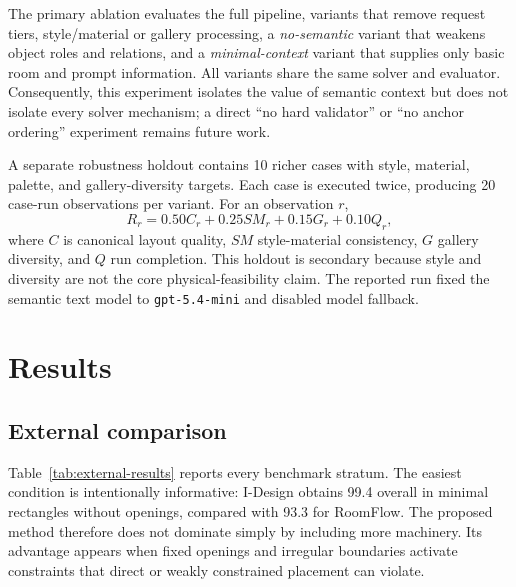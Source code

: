 \documentclass[pdflatex,sn-mathphys-num]{sn-jnl}
\newcommand{\method}{RoomFlow}
\begin{document}
The primary ablation evaluates the full pipeline, variants that remove request tiers, style/material or gallery processing, a \emph{no-semantic} variant that weakens object roles and relations, and a \emph{minimal-context} variant that supplies only basic room and prompt information. All variants share the same solver and evaluator. Consequently, this experiment isolates the value of semantic context but does not isolate every solver mechanism; a direct ``no hard validator'' or ``no anchor ordering'' experiment remains future work.

A separate robustness holdout contains 10 richer cases with style, material, palette, and gallery-diversity targets. Each case is executed twice, producing 20 case-run observations per variant. For an observation \(r\),
\begin{equation}
  R_r=0.50C_r+0.25SM_r+0.15G_r+0.10Q_r,
  \label{eq:robustness}
\end{equation}
where \(C\) is canonical layout quality, \(SM\) style-material consistency, \(G\) gallery diversity, and \(Q\) run completion. This holdout is secondary because style and diversity are not the core physical-feasibility claim. The reported run fixed the semantic text model to \texttt{gpt-5.4-mini} and disabled model fallback.

\section{Results}\label{sec:results}

\subsection{External comparison}

Table~\ref{tab:external-results} reports every benchmark stratum. The easiest condition is intentionally informative: I-Design obtains 99.4 overall in minimal rectangles without openings, compared with 93.3 for \method. The proposed method therefore does not dominate simply by including more machinery. Its advantage appears when fixed openings and irregular boundaries activate constraints that direct or weakly constrained placement can violate.
\end{document}
